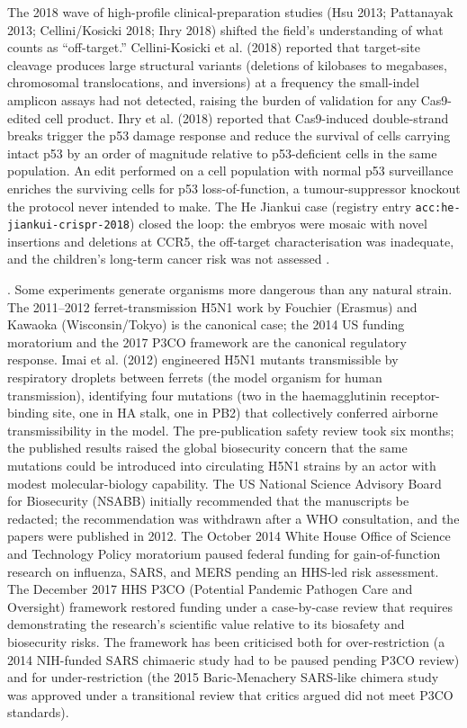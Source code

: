 The 2018 wave of high-profile clinical-preparation studies (Hsu
2013; Pattanayak 2013; Cellini/Kosicki 2018; Ihry 2018) shifted the
field's understanding of what counts as ``off-target.''
Cellini-Kosicki et al. (2018)
\cite[pp.~767--770]{paper:v6c09-kosicki-deletions-2018} reported
that target-site cleavage produces large structural variants
(deletions of kilobases to megabases, chromosomal translocations,
and inversions) at a frequency the small-indel amplicon assays had
not detected, raising the burden of validation for any
Cas9-edited cell product. Ihry et al. (2018)
\cite[pp.~939--942]{paper:v6c09-ihry-p53-2018} reported that
Cas9-induced double-strand breaks trigger the p53 damage response
and reduce the survival of cells carrying intact p53 by an
order of magnitude relative to p53-deficient cells in the same
population. An edit performed on a cell population with normal
p53 surveillance enriches the surviving cells for p53 loss-of-function,
a tumour-suppressor knockout the protocol never intended to make.
The He Jiankui case (registry entry
\texttt{acc:he-jiankui-crispr-2018}) closed the loop: the embryos
were mosaic with novel insertions and deletions at CCR5, the
off-target characterisation was inadequate, and the children's
long-term cancer risk was not assessed
\cite[pp.~127--132]{text:v6c09-nas-heritable-editing-2020}.

. Some experiments
generate organisms more dangerous than any natural strain. The
2011--2012 ferret-transmission H5N1 work by Fouchier (Erasmus) and
Kawaoka (Wisconsin/Tokyo) is the canonical case; the 2014 US
funding moratorium and the 2017 P3CO framework are the canonical
regulatory response\cite[pp.~534--541]{paper:v6c09-imai-h5n1-2012}.
Imai et al. (2012) engineered H5N1 mutants transmissible by
respiratory droplets between ferrets (the model organism for human
transmission), identifying four mutations (two in the haemagglutinin
receptor-binding site, one in HA stalk, one in PB2) that
collectively conferred airborne transmissibility in the model.
The pre-publication safety review took six months; the published
results raised the global biosecurity concern that the same
mutations could be introduced into circulating H5N1 strains by an
actor with modest molecular-biology capability. The US National
Science Advisory Board for Biosecurity (NSABB) initially recommended
that the manuscripts be redacted; the recommendation was withdrawn
after a WHO consultation, and the papers were published in 2012.
The October 2014 White House Office of Science and Technology
Policy moratorium paused federal funding for gain-of-function
research on influenza, SARS, and MERS pending an HHS-led risk
assessment. The December 2017 HHS P3CO (Potential Pandemic
Pathogen Care and Oversight) framework restored funding under a
case-by-case review that requires demonstrating the research's
scientific value relative to its biosafety and biosecurity risks.
The framework has been criticised both for over-restriction (a
2014 NIH-funded SARS chimaeric study had to be paused pending
P3CO review) and for under-restriction (the 2015 Baric-Menachery
SARS-like chimera study was approved under a transitional review
that critics argued did not meet P3CO standards).

